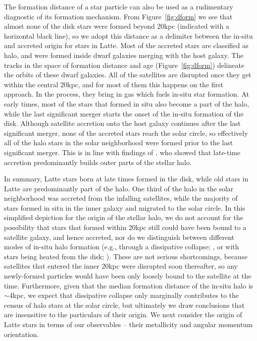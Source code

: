 \documentclass[apj, twocolappendix, numberedappendix, appendixfloats]{emulateapj}
\begin{document}
The formation distance of a star particle can also be used as a rudimentary diagnostic of its formation mechanism.
From Figure~\ref{fig:dform} we see that almost none of the disk stars were formed beyond 20\;kpc (indicated with a horizontal black line), so we adopt this distance as a delimiter between the in-situ and accreted origin for stars in Latte.
Most of the accreted stars are classified as halo, and were formed inside dwarf galaxies merging with the host galaxy.
The tracks in the space of formation distance and age (Figure~\ref{fig:dform}) delineate the orbits of these dwarf galaxies.
All of the satellites are disrupted once they get within the central 20\;kpc, and for most of them this happens on the first approach.
In the process, they bring in gas which fuels in-situ star formation.
At early times, most of the stars that formed in situ also become a part of the halo, while the last significant merger starts the onset of the in-situ formation of the disk.
Although satellite accretion onto the host galaxy continues after the last significant merger, none of the accreted stars reach the solar circle, so effectively all of the halo stars in the solar neighborhood were formed prior to the last significant merger.
This is in line with findings of \citet{zolotov2009}, who showed that late-time accretion predominantly builds outer parts of the stellar halo.

In summary, Latte stars born at late times formed in the disk, while old stars in Latte are predominantly part of the halo.
One third of the halo in the solar neighborhood was accreted from the infalling satellites, while the majority of stars formed in situ in the inner galaxy and migrated to the solar circle.
In this simplified depiction for the origin of the stellar halo, we do not account for the possibility that stars that formed within 20\;kpc still could have been bound to a satellite galaxy, and hence accreted, nor do we distinguish between different modes of in-situ halo formation (e.g., through a dissipative collapse; \citealt{samland2003}, or with stars being heated from the disk; \citealt{purcell2010}).
These are not serious shortcomings, because satellites that entered the inner 20\;kpc were disrupted soon thereafter, so any newly-formed particles would have been only loosely bound to the satellite at the time.
Furthermore, given that the median formation distance of the in-situ halo is $\sim4$\;kpc, we expect that dissipative collapse only marginally contributes to the census of halo stars at the solar circle, but ultimately we draw conclusions that are insensitive to the particulars of their origin.
We next consider the origin of Latte stars in terms of our observables -- their metallicity and angular momentum orientation.
\end{document}
